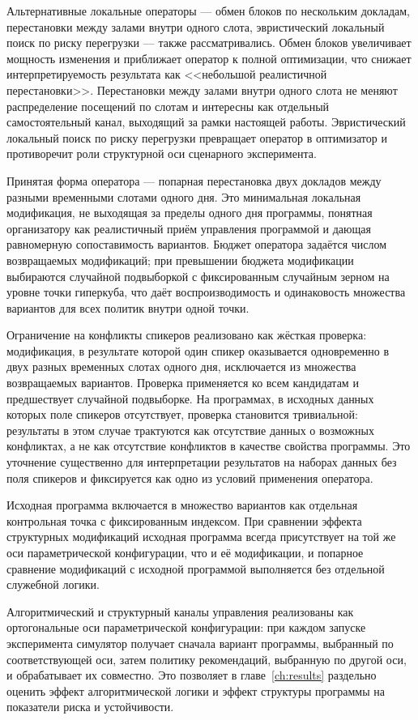 Альтернативные локальные операторы --- обмен блоков по нескольким докладам, перестановки между залами внутри одного слота, эвристический локальный поиск по риску перегрузки --- также рассматривались. Обмен блоков увеличивает мощность изменения и приближает оператор к полной оптимизации, что снижает интерпретируемость результата как <<небольшой реалистичной перестановки>>. Перестановки между залами внутри одного слота не меняют распределение посещений по слотам и интересны как отдельный самостоятельный канал, выходящий за рамки настоящей работы. Эвристический локальный поиск по риску перегрузки превращает оператор в оптимизатор и противоречит роли структурной оси сценарного эксперимента.

Принятая форма оператора --- попарная перестановка двух докладов между разными временными слотами одного дня. Это минимальная локальная модификация, не выходящая за пределы одного дня программы, понятная организатору как реалистичный приём управления программой и дающая равномерную сопоставимость вариантов. Бюджет оператора задаётся числом возвращаемых модификаций; при превышении бюджета модификации выбираются случайной подвыборкой с фиксированным случайным зерном на уровне точки гиперкуба, что даёт воспроизводимость и одинаковость множества вариантов для всех политик внутри одной точки.

Ограничение на конфликты спикеров реализовано как жёсткая проверка: модификация, в результате которой один спикер оказывается одновременно в двух разных временных слотах одного дня, исключается из множества возвращаемых вариантов. Проверка применяется ко всем кандидатам и предшествует случайной подвыборке. На программах, в исходных данных которых поле спикеров отсутствует, проверка становится тривиальной: результаты в этом случае трактуются как отсутствие данных о возможных конфликтах, а не как отсутствие конфликтов в качестве свойства программы. Это уточнение существенно для интерпретации результатов на наборах данных без поля спикеров и фиксируется как одно из условий применения оператора.

Исходная программа включается в множество вариантов как отдельная контрольная точка с фиксированным индексом. При сравнении эффекта структурных модификаций исходная программа всегда присутствует на той же оси параметрической конфигурации, что и её модификации, и попарное сравнение модификаций с исходной программой выполняется без отдельной служебной логики.

Алгоритмический и структурный каналы управления реализованы как ортогональные оси параметрической конфигурации: при каждом запуске эксперимента симулятор получает сначала вариант программы, выбранный по соответствующей оси, затем политику рекомендаций, выбранную по другой оси, и обрабатывает их совместно. Это позволяет в главе~\ref{ch:results} раздельно оценить эффект алгоритмической логики и эффект структуры программы на показатели риска и устойчивости.


